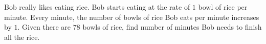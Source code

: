 Bob really likes eating rice. Bob starts eating at the rate of $1$ bowl of rice per minute. Every minute, the number of bowls of rice Bob eats per minute increases by $1$. Given there are $78$ bowls of rice, find number of minutes Bob needs to finish all the rice.
